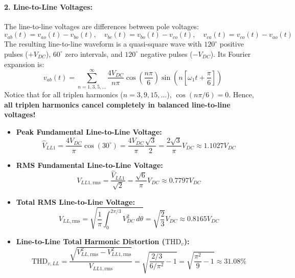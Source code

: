 \paragraph{2. Line-to-Line Voltages:}
The line-to-line voltages are differences between pole voltages:
\begin{equation}
v_{ab}(t) = v_{ao}(t) - v_{bo}(t), \quad v_{bc}(t) = v_{bo}(t) - v_{co}(t), \quad v_{ca}(t) = v_{co}(t) - v_{ao}(t)
\end{equation}
The resulting line-to-line waveform is a quasi-square wave with $120^\circ$ positive pulses ($+V_{DC}$), $60^\circ$ zero intervals, and $120^\circ$ negative pulses ($-V_{DC}$). Its Fourier expansion is:
\begin{equation}
v_{ab}(t) = \sum_{n=1,3,5,\dots}^\infty \frac{4 V_{DC}}{n\pi} \cos\left(\frac{n\pi}{6}\right) \sin\left(n\left[\omega_1 t + \frac{\pi}{6}\right]\right)
\end{equation}
Notice that for all triplen harmonics ($n = 3, 9, 15, \dots$), $\cos(n\pi/6) = 0$. Hence, \textbf{all triplen harmonics cancel completely in balanced line-to-line voltages!}
\begin{itemize}
  \item \textbf{Peak Fundamental Line-to-Line Voltage:}
  \begin{equation}
  \hat{V}_{LL1} = \frac{4 V_{DC}}{\pi} \cos(30^\circ) = \frac{4 V_{DC}}{\pi} \frac{\sqrt{3}}{2} = \frac{2\sqrt{3}}{\pi} V_{DC} \approx 1.1027 V_{DC}
  \end{equation}
  \item \textbf{RMS Fundamental Line-to-Line Voltage:}
  \begin{equation}
  V_{LL1,\mathrm{rms}} = \frac{\hat{V}_{LL1}}{\sqrt{2}} = \frac{\sqrt{6}}{\pi} V_{DC} \approx 0.7797 V_{DC}
  \end{equation}
  \item \textbf{Total RMS Line-to-Line Voltage:}
  \begin{equation}
  V_{LL,\mathrm{rms}} = \sqrt{\frac{1}{\pi}\int_0^{2\pi/3} V_{DC}^2\,d\theta} = \sqrt{\frac{2}{3}} V_{DC} \approx 0.8165 V_{DC}
  \end{equation}
  \item \textbf{Line-to-Line Total Harmonic Distortion ($\mathrm{THD}_v$):}
  \begin{equation}
  \mathrm{THD}_{v,LL} = \frac{\sqrt{V_{LL,\mathrm{rms}}^2 - V_{LL1,\mathrm{rms}}^2}}{V_{LL1,\mathrm{rms}}} = \sqrt{\frac{2/3}{6/\pi^2} - 1} = \sqrt{\frac{\pi^2}{9} - 1} \approx 31.08\%
  \end{equation}
\end{itemize}

